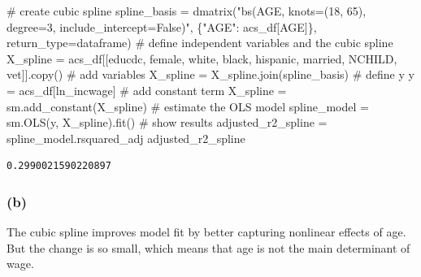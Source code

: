 \documentclass[
  letterpaper,
  DIV=11,
  numbers=noendperiod]{scrartcl}
\newenvironment{Shaded}{\begin{snugshade}}{\end{snugshade}}
\newcommand{\CommentTok}[1]{\textcolor[rgb]{0.37,0.37,0.37}{#1}}
\newcommand{\NormalTok}[1]{\textcolor[rgb]{0.00,0.23,0.31}{#1}}
\newcommand{\OperatorTok}[1]{\textcolor[rgb]{0.37,0.37,0.37}{#1}}
\newcommand{\StringTok}[1]{\textcolor[rgb]{0.13,0.47,0.30}{#1}}
\begin{document}
\begin{Shaded}
\begin{Highlighting}[]
\CommentTok{\# create cubic spline}
\NormalTok{spline\_basis }\OperatorTok{=}\NormalTok{ dmatrix(}\StringTok{"bs(AGE, knots=(18, 65), degree=3, include\_intercept=False)"}\NormalTok{,}
\NormalTok{                       \{}\StringTok{"AGE"}\NormalTok{: acs\_df[}\StringTok{\textquotesingle{}AGE\textquotesingle{}}\NormalTok{]\}, return\_type}\OperatorTok{=}\StringTok{\textquotesingle{}dataframe\textquotesingle{}}\NormalTok{)}
\CommentTok{\# define independent variables and the cubic spline}
\NormalTok{X\_spline }\OperatorTok{=}\NormalTok{ acs\_df[[}\StringTok{\textquotesingle{}educdc\textquotesingle{}}\NormalTok{, }\StringTok{\textquotesingle{}female\textquotesingle{}}\NormalTok{, }\StringTok{\textquotesingle{}white\textquotesingle{}}\NormalTok{, }\StringTok{\textquotesingle{}black\textquotesingle{}}\NormalTok{,}
                   \StringTok{\textquotesingle{}hispanic\textquotesingle{}}\NormalTok{, }\StringTok{\textquotesingle{}married\textquotesingle{}}\NormalTok{, }\StringTok{\textquotesingle{}NCHILD\textquotesingle{}}\NormalTok{, }\StringTok{\textquotesingle{}vet\textquotesingle{}}\NormalTok{]].copy()}
\CommentTok{\# add variables}
\NormalTok{X\_spline }\OperatorTok{=}\NormalTok{ X\_spline.join(spline\_basis)}
\CommentTok{\# define y}
\NormalTok{y }\OperatorTok{=}\NormalTok{ acs\_df[}\StringTok{\textquotesingle{}ln\_incwage\textquotesingle{}}\NormalTok{]}
\CommentTok{\# add constant term}
\NormalTok{X\_spline }\OperatorTok{=}\NormalTok{ sm.add\_constant(X\_spline)}
\CommentTok{\# estimate the OLS model}
\NormalTok{spline\_model }\OperatorTok{=}\NormalTok{ sm.OLS(y, X\_spline).fit()}
\CommentTok{\# show results}
\NormalTok{adjusted\_r2\_spline }\OperatorTok{=}\NormalTok{ spline\_model.rsquared\_adj}
\NormalTok{adjusted\_r2\_spline}
\end{Highlighting}
\end{Shaded}

\begin{verbatim}
0.2990021590220897
\end{verbatim}

\subsubsection{(b)}\label{b-2}

The cubic spline improves model fit by better capturing nonlinear
effects of age. But the change is so small, which means that age is not
the main determinant of wage.
\end{document}
